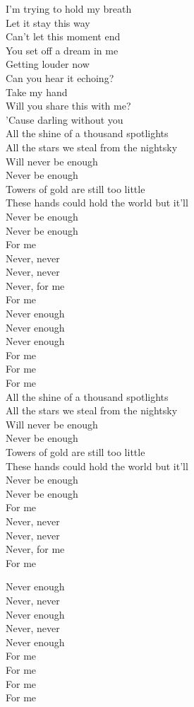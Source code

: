 
I'm trying to hold my breath \tab{}\\
Let it stay this way \tab{} \\
Can't let this moment end \tab{}\\
You set off a dream in me \tab{}\\
Getting louder now \tab{}\\
Can you hear it echoing? \tab{}\\
\hops
Take my hand \tab{}\tab{} \\
Will you share this with me? \tab{}\\
'Cause darling without you \tab{}\\
\hops
All the shine of a thousand spotlights \\
All the stars we steal from the nightsky \\
Will never be enough \tab{}\\
Never be enough \tab{}\\
Towers of gold are still too little \\
These hands could hold the world but it'll \\
Never be enough \tab{}\\
Never be enough \tab{}\\
\hops
For me \tab{}\\
Never, never\\
Never, never \tab{}\\
Never, for me \tab{}\\
For me\\
Never enough \tab{}\\
Never enough \tab{}\\
Never enough \tab{}\\
For me \tab{}\\
For me\\
For me\\
\hops
All the shine of a thousand spotlights\\
All the stars we steal from the nightsky\\
Will never be enough\\
Never be enough\\
Towers of gold are still too little\\
These hands could hold the world but it'll\\
Never be enough\\
Never be enough\\
\hops
For me\\
Never, never\\
Never, never\\
Never, for me\\
For me

Never enough\\
Never, never\\
Never enough\\
Never, never\\
Never enough\\
For me\\
For me\\
For me\\
For me